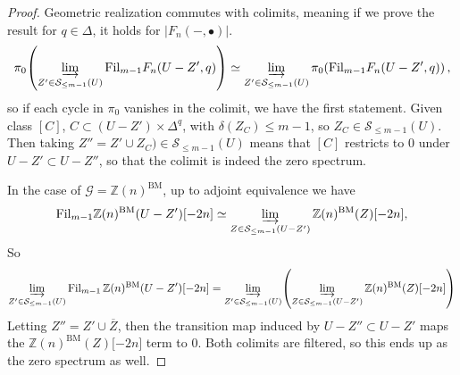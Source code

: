 \documentclass[11pt, twoside]{article}
\numberwithin{equation}{section}
\theoremstyle{definition}
\newcommand{\bb}[1]{\mathbb{#1}}
\newcommand{\colim}{\varinjlim}
\newcommand{\fil}{\mathrm{Fil}}
\newcommand{\bm}{\mathrm{BM}}
\begin{document}
\begin{proof}
Geometric realization commutes with colimits, meaning if we prove the result for \(q \in \Delta\), it holds for \(|F_n( -, \bullet)|\). 
\[\pi_0 \! \left(\colim_{Z' \in \mathcal{S}_{\leq m - 1}(U)} \fil_{m - 1} F_n(U - Z', q)\right) \simeq \colim_{Z' \in \mathcal{S}_{\leq m - 1}(U)} \pi_0 \! \left(\fil_{m - 1} F_n(U - Z', q)\right),\]
so if each cycle in \(\pi_0\) vanishes in the colimit, we have the first statement. Given class \([C]\), \(C \subset (U - Z') \times \Delta^q\), with \(\delta(Z_C) \leq m - 1\), so \(Z_C \in \mathcal{S}_{\leq m - 1}(U)\). Then taking \(Z'' = Z' \cup Z_C) \in \mathcal{S}_{\leq m - 1}(U)\) means that \([C]\) restricts to \(0\) under \(U - Z' \subset U - Z''\), so that the colimit is indeed the zero spectrum.

In the case of \(\mathcal{G} = \bb{Z}(n)^\bm\), up to adjoint equivalence we have 
\[\fil_{m - 1} \bb{Z}(n)^\bm(U - Z')\lbrack -2n \rbrack \simeq \colim_{Z \in \mathcal{S}_{\leq m - 1}(U - Z')} \bb{Z}(n)^\bm(Z) \lbrack - 2n \rbrack,\]
So
\[\colim_{Z' \in \mathcal{S}_{\leq m - 1}(U)} \fil_{m - 1} \, \bb{Z}(n)^\bm(U - Z')\lbrack -2n \rbrack = \colim_{Z' \in \mathcal{S}_{\leq m - 1}(U)} \! \left(\colim_{Z \in \mathcal{S}_{\leq m - 1}(U - Z')} \bb{Z}(n)^\bm(Z) \lbrack - 2n \rbrack\right)\]
Letting \(Z'' = Z' \cup \overline{Z}\), then the transition map induced by \(U - Z'' \subset U - Z'\) maps the \(\bb{Z}(n)^\bm(Z) \lbrack - 2n \rbrack\) term to \(0\). Both colimits are filtered, so this ends up as the zero spectrum as well. 


\end{proof}
\end{document}

